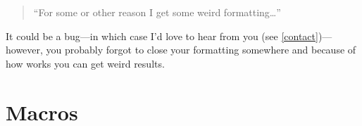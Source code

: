 \documentclass[11pt, cm-default]{l3doc}
\begin{document}
	\begin{quotation}
		``For some or other reason I get some weird formatting\dots''
	\end{quotation}

	It could be a bug---in which case I'd love to hear from you (see \ref{contact})---however, you probably forgot to close your formatting somewhere and because of how  works you can get weird results.



	
	


	\section{Macros}
\end{document}
